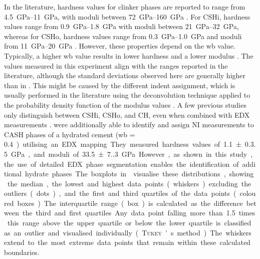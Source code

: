 In the literature, hardness values for clinker phases are reported to range from \qtyrange{4.5}{11}{\giga\pascal}, with moduli between \qtyrange{72}{160}{\giga\pascal} \cite{sebastiani.2016,han.2012,xu.2017, lahayne.2022}.
For \ac{CSHi}, hardness values range from \qtyrange{0.9}{1.8}{\giga\pascal} with moduli between \qtyrange{21}{32}{\giga\pascal}, whereas for \ac{CSHo}, hardness values range from \qtyrange{0.3}{1.0}{\giga\pascal} and moduli from \qtyrange{11}{20}{\giga\pascal} \cite{han.2012, xu.2017, lahayne.2022}.
However, these properties depend on the \ac{wb} value.
Typically, a higher \ac{wb} value results in lower hardness and a lower modulus \cite{xu.2017}.
The values measured in this experiment align with the ranges reported in the literature, although the standard deviations observed here are generally higher than in \cite{sebastiani.2016,xu.2017}.
This might be caused by the different indent assignment, which is usually performed in the literature using the deconvolution technique applied to the probability density function of the modulus values \cite{sebastiani.2016,xu.2017}.
A few previous studies only distinguish between \ac{CSHi}, \ac{CSHo}, and \ac{CH}, even when combined with \ac{EDX} measurements \cite{sebastiani.2016, lahayne.2022}.
\textcite{wilson.2018} were additionally able to identify and assign \ac{NI} measurements to \ac{CASH} phases of a hydrated cement (\ac{wb} = \qty{0.4}) utilising an \ac{EDX} mapping.
They measured hardness values of \qty{1.1(0.35)}{\giga\pascal}, and moduli of \qty{33.5(7.3)}{\giga\pascal}.
However, as shown in this study, the use of detailed \ac{EDX} phase segmentation enables the identification of additional hydrate phases.

The boxplots in  visualise these distributions, showing the median, the lowest and highest data points (whiskers) excluding the outliers (dots), and the first and third quartiles of the data points (coloured boxes).
The interquartile range (box) is calculated as the difference between the third and first quartiles.
Any data point falling more than \num{1.5} times this range above the upper quartile or below the lower quartile is classified as an outlier and visualised individually (\textsc{Tukey}'s method).
The whiskers extend to the most extreme data points that remain within these calculated boundaries.

